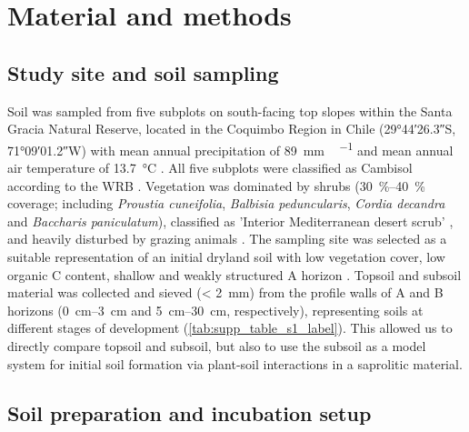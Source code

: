\section{Material and methods}
\subsection{Study site and soil sampling}

Soil was sampled from five subplots on south-facing top slopes within the Santa Gracia Natural Reserve, located in the Coquimbo Region in Chile (\ang{29;44;26.3}S, \ang{71;09;01.2}W) with mean annual precipitation of \SI{89}{\milli\metre\,\year^{-1}} and mean annual air temperature of \SI{13.7}{\degreeCelsius} \citep{MinisterioObrasPublicas2017}. All five subplots were classified as Cambisol according to the WRB \citep{IUSSWorkingGroupWRB2015}. Vegetation was dominated by shrubs (\SIrange{30}{40}{\percent} coverage; including \textit{Proustia cuneifolia}, \textit{Balbisia peduncularis}, \textit{Cordia decandra} and \textit{Baccharis paniculatum}), classified as 'Interior Mediterranean desert scrub' \citep{Luebert2006}, and heavily disturbed by grazing animals \citep{Oeser2018}. The sampling site was selected as a suitable representation of an initial dryland soil with low vegetation cover, low organic C content, shallow and weakly structured A horizon \citep{Bernhard2018}. Topsoil and subsoil material was collected and sieved (\SI{< 2}{\milli\metre}) from the profile walls of A and B horizons (\SIrange{0}{3}{\centi\metre} and \SIrange{5}{30}{\centi\metre}, respectively), representing soils at different stages of development (\cref{tab:supp_table_s1_label}). This allowed us to directly compare topsoil and subsoil, but also to use the subsoil as a model system for initial soil formation via plant-soil interactions in a saprolitic material.

\subsection{Soil preparation and incubation setup}

